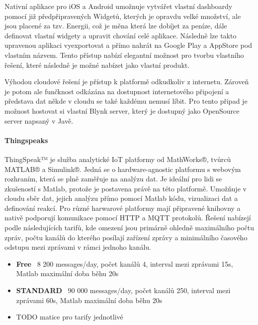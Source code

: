 \documentclass[thesis=B,czech]{FITthesis}[2019/12/23]
\begin{document}
Nativní aplikace pro iOS a Android umožnuje vytvářet vlastní dashboardy pomocí již předpřipravených Widgetů, kterých je opravdu velké množství, ale jsou placené za tzv. Energii, což je měna která lze dobíjet za peníze, dále definovat vlastní widgety a upravit chování celé aplikace. Následně lze takto upravenou aplikaci vyexportovat a přímo nahrát na Google Play a AppStore pod vlastním názvem. Tento přístup nabízí elegantní možnost pro tvorbu vlastního řešení, které následně je možné nabízet jako vlastní produkt.

Výhodou cloudové řešení je přístup k platformě odkudkoliv z internetu. Zároveň je potom ale funčknost odkázána na dostupnost internetového připojení a představa dat někde v cloudu se také každému nemusí líbit. Pro tento připad je možnost hostovat si vlastní Blynk server, který je dostupný jako OpenSource server napsaný v Javě. %

\paragraph{Thingspeaks}
ThingSpeak™ je služba analytické IoT platformy od MathWorks®, tvůrců MATLAB® a Simulink®. Jedná se o hardware-agnostic platformu s webovým rozhraním, která se plně zaměřuje na analýzu dat. Je ideální pro lidi se zkušeností s Matlab, protože je postavena právě na této platformě. Umožňuje v cloudu sběr dat, jejich analýzu přímo pomocí Matlab kódu, vizualizaci dat a definování reakcí. Pro různé harwarové platformy mají připravené knihovny a nativě podporují komunikace pomocí HTTP a MQTT protokolů. Řešení nabízejí podle následujících tarifů, kde omezení jsou primárně ohledně maximálního počtu zpráv, počtu kanálů do kterého posílají zařízení zprávy a minimálního časového odstupu mezi zprávami v rámci jednoho kanálu.
\begin{itemize}
    \item \textbf{Free} ~8 200 messages/day, počet kanálů 4, interval mezi zprávami 15s, Matlab maximální doba běhu 20s
    \item \textbf{STANDARD} ~90 000 messages/day, počet kanálů 250, interval mezi zprávami 60s, Matlab maximální doba běhu 20s
    \item TODO matice pro tarify jednotlivé
\end{itemize}
\end{document}
